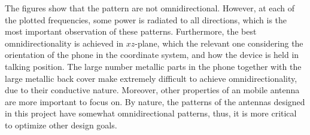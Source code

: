 The figures show that the pattern are not omnidirectional. However, at each of the plotted frequencies, some power is radiated to all directions, which is the most important observation of these patterns. Furthermore, the best omnidirectionality is achieved in $xz$-plane, which the relevant one considering the orientation of the phone in the coordinate system, and how the device is held in talking position. The large number metallic parts in the phone together with the large metallic back cover make extremely difficult to achieve omnidirectionality, due to their conductive nature. Moreover, other properties of an mobile antenna are more important to focus on. By nature, the patterns of the antennas designed in this project have somewhat omnidirectional patterns, thus, it is more critical to optimize other design goals.
\clearpage